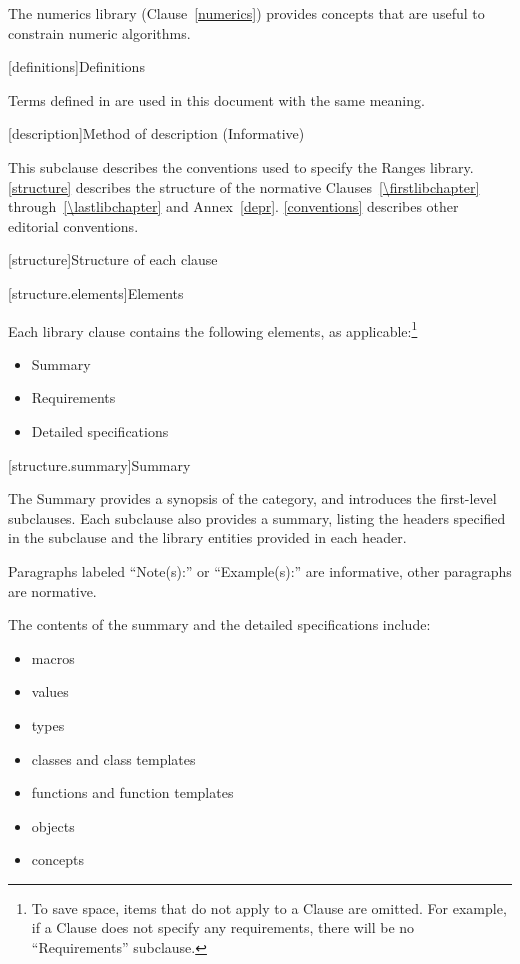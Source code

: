 \pnum
The numerics library (Clause~\ref{numerics}) provides concepts that are useful
to constrain numeric algorithms.

[definitions]{Definitions}

\pnum
Terms defined in  are used in this document with the same
meaning.

[description]{Method of description (Informative)}

\pnum
This subclause describes the conventions used to specify the Ranges
library. \ref{structure} describes the structure of the normative
Clauses~\ref{\firstlibchapter} through~\ref{\lastlibchapter} and
Annex~\ref{depr}. \ref{conventions} describes other editorial conventions.

[structure]{Structure of each clause}

[structure.elements]{Elements}

\pnum
Each library clause contains the following elements, as applicable:\footnote{To
save space, items that do not apply to a Clause are omitted.
For example, if a Clause does not specify any requirements,
there will be no ``Requirements'' subclause.}

\begin{itemize}
\item Summary
\item Requirements
\item Detailed specifications
\end{itemize}

[structure.summary]{Summary}

\pnum
The Summary provides a synopsis of the category, and introduces the first-level subclauses.
Each subclause also provides a summary, listing the headers specified in the
subclause and the library entities provided in each header.

\pnum
Paragraphs labeled ``Note(s):'' or ``Example(s):'' are informative, other paragraphs
are normative.

\pnum
The contents of the summary and the detailed specifications include:

\begin{itemize}
\item macros
\item values
\item types
\item classes and class templates
\item functions and function templates
\item objects
\item concepts
\end{itemize}

